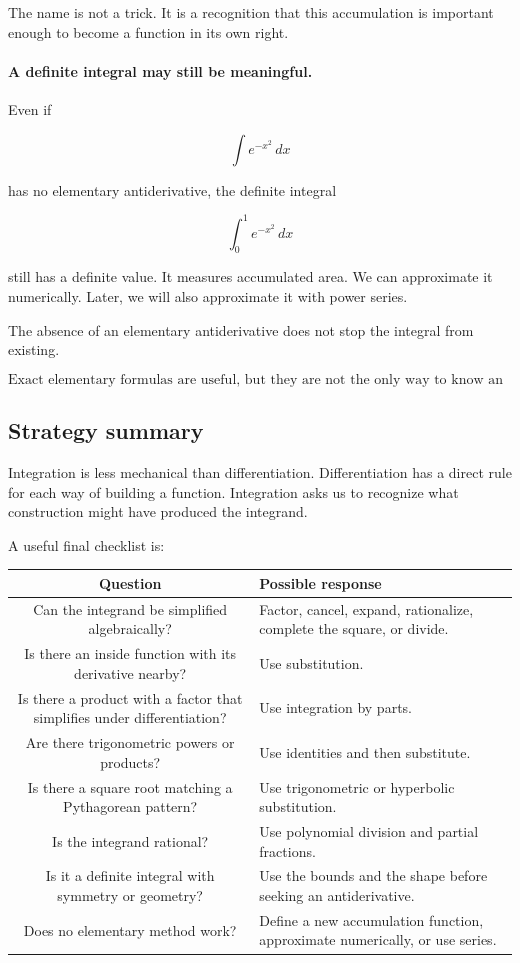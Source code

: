 The name is not a trick.  It is a recognition that this accumulation is important enough
to become a function in its own right.

\paragraph{A definite integral may still be meaningful.}
Even if

\[
\int e^{-x^2}\,dx
\]

has no elementary antiderivative, the definite integral

\[
\int_0^1 e^{-x^2}\,dx
\]

still has a definite value.  It measures accumulated area.  We can approximate it
numerically.  Later, we will also approximate it with power series.

The absence of an elementary antiderivative does not stop the integral from existing.

\[
\boxed{
\text{Exact elementary formulas are useful, but they are not the only way to know an integral.}
}
\]

\subsection{Strategy summary}
\label{subsec:strategy-summary}

Integration is less mechanical than differentiation.  Differentiation has a direct rule for
each way of building a function.  Integration asks us to recognize what construction
might have produced the integrand.

A useful final checklist is:

\begin{center}
\begin{tabular}{c|p{}}
\textbf{Question} & \textbf{Possible response} \\ \hline
Can the integrand be simplified algebraically? & Factor, cancel, expand, rationalize, complete the square, or divide. \\[5pt]
Is there an inside function with its derivative nearby? & Use substitution. \\[5pt]
Is there a product with a factor that simplifies under differentiation? & Use integration by parts. \\[5pt]
Are there trigonometric powers or products? & Use identities and then substitute. \\[5pt]
Is there a square root matching a Pythagorean pattern? & Use trigonometric or hyperbolic substitution. \\[5pt]
Is the integrand rational? & Use polynomial division and partial fractions. \\[5pt]
Is it a definite integral with symmetry or geometry? & Use the bounds and the shape before seeking an antiderivative. \\[5pt]
Does no elementary method work? & Define a new accumulation function, approximate numerically, or use series.
\end{tabular}
\end{center}

